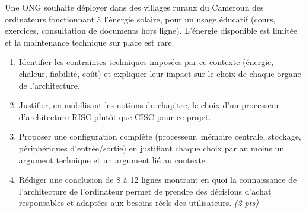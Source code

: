 \documentclass[11pt]{article}
\begin{document}
\begin{exercice}
Une ONG souhaite déployer dans des villages ruraux du Cameroun des ordinateurs fonctionnant à l'énergie solaire, pour un usage éducatif (cours, exercices, consultation de documents hors ligne). L'énergie disponible est limitée et la maintenance technique sur place est rare.

\begin{enumerate}
\item Identifier les contraintes techniques imposées par ce contexte (énergie, chaleur, fiabilité, coût) et expliquer leur impact sur le choix de chaque organe de l'architecture.
\item Justifier, en mobilisant les notions du chapitre, le choix d'un processeur d'architecture RISC plutôt que CISC pour ce projet.
\item Proposer une configuration complète (processeur, mémoire centrale, stockage, périphériques d'entrée/sortie) en justifiant chaque choix par au moins un argument technique et un argument lié au contexte.
\item Rédiger une conclusion de 8 à 12 lignes montrant en quoi la connaissance de l'architecture de l'ordinateur permet de prendre des décisions d'achat responsables et adaptées aux besoins réels des utilisateurs. \emph{(2 pts)}
\end{enumerate}
\end{exercice}
\end{document}
